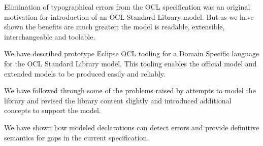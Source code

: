 \documentclass{eceasst}
\begin{document}
Elimination of typographical errors from the OCL specification was an original motivation for introduction of an OCL Standard Library model. But as we have shown the benefits are much greater; the model is readable, extensible, interchangeable and toolable.

We have described prototype Eclipse OCL tooling for a Domain Specific language for the OCL Standard Library model. This tooling enables the official model and extended models to be produced easily and reliably.

We have followed through some of the problems raised by attempts to model the library and revised the library content slightly and introduced additional concepts to support the model.

We have shown how modeled declarations can detect errors and provide definitive semantics for gaps in the current specification.

\nocite{*}


\end{document}
